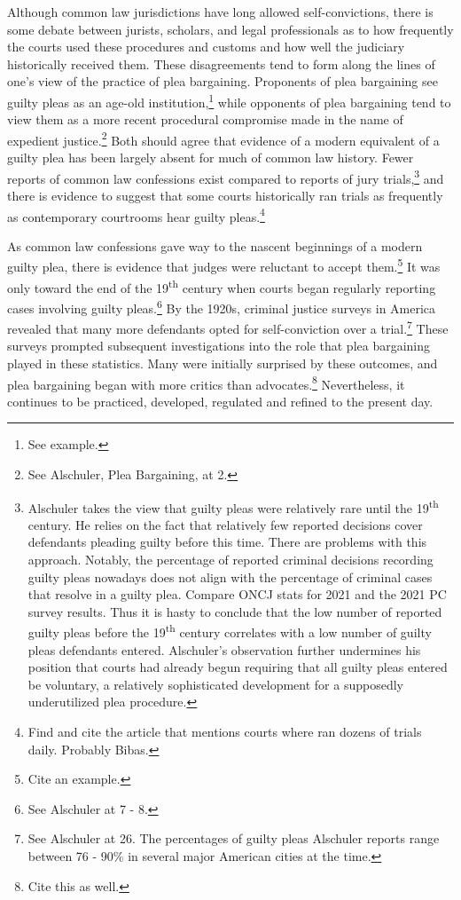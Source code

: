 Although common law jurisdictions have long allowed self-convictions, there is some debate between jurists, scholars, and legal professionals as to how frequently the courts used these procedures and customs and how well the judiciary historically received them. These disagreements tend to form along the lines of one's view of the practice of plea bargaining. Proponents of plea bargaining see guilty pleas as an age-old institution,\footnote{See example.} while opponents of plea bargaining tend to view them as a more recent procedural compromise made in the name of expedient justice.\footnote{See Alschuler, Plea Bargaining, at 2.} Both should agree that evidence of a modern equivalent of a guilty plea has been largely absent for much of common law history. Fewer reports of common law confessions exist compared to reports of jury trials,\footnote{Alschuler takes the view that guilty pleas were relatively rare until the 19\textsuperscript{th} century. He relies on the fact that relatively few reported decisions cover defendants pleading guilty before this time. There are problems with this approach. Notably, the percentage of reported criminal decisions recording guilty pleas nowadays does not align with the percentage of criminal cases that resolve in a guilty plea. Compare ONCJ stats for 2021 and the 2021 PC survey results. Thus it is hasty to conclude that the low number of reported guilty pleas before the 19\textsuperscript{th} century correlates with a low number of guilty pleas defendants entered. Alschuler's observation further undermines his position that courts had already begun requiring that all guilty pleas entered be voluntary, a relatively sophisticated development for a supposedly underutilized plea procedure.} and there is evidence to suggest that some courts historically ran trials as frequently as contemporary courtrooms hear guilty pleas.\footnote{Find and cite the article that mentions courts where ran dozens of trials daily. Probably Bibas.} 

As common law confessions gave way to the nascent beginnings of a modern guilty plea, there is evidence that judges were reluctant to accept them.\footnote{Cite an example.} It was only toward the end of the 19\textsuperscript{th} century when courts began regularly reporting cases involving guilty pleas.\footnote{See Alschuler at 7 - 8.} By the 1920s, criminal justice surveys in America revealed that many more defendants opted for self-conviction over a trial.\footnote{See Alschuler at 26. The percentages of guilty pleas Alschuler reports range between 76 - 90\% in several major American cities at the time.} These surveys prompted subsequent investigations into the role that plea bargaining played in these statistics. Many were initially surprised by these outcomes, and plea bargaining began with more critics than advocates.\footnote{Cite this as well.} Nevertheless, it continues to be practiced, developed, regulated and refined to the present day.

